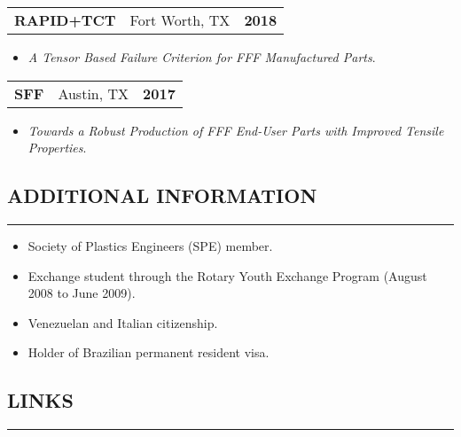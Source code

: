 \documentclass[11pt,letterpaper]{article}
\makeatletter
\newcommand{\headerrow}[3]
{\vspace{0.4em}
\noindent
\begin{tabular*}{\textwidth}{l @{\extracolsep{\fill}} cr}
	\textbf{#1} & %
	#2 &		  %
	\textbf{#3}\\ %
\end{tabular*}}
\makeatother
\begin{document}
	\headerrow
		{RAPID+TCT}{Fort Worth, TX}{2018}
	\begin{itemize}
		\item \emph{A Tensor Based Failure Criterion for FFF Manufactured Parts}.
	\end{itemize}

	\headerrow
		{SFF}
		{Austin, TX}
		{2017}
	\begin{itemize}
		\item \emph{Towards a Robust Production of FFF End-User Parts with Improved Tensile Properties}. 
	\end{itemize}


	
\subsection*{ADDITIONAL INFORMATION}
	\vspace{-0.5em}
	\hrule
	\vspace{0.8em}
	\begin{itemize}
		\item Society of Plastics Engineers (SPE) member.
		\item Exchange student through the Rotary Youth Exchange Program (August 2008 to June 2009).
		\item Venezuelan and Italian citizenship.
		\item Holder of Brazilian permanent resident visa.
	\end{itemize}
	
\subsection*{LINKS}
	\vspace{-0.5em}
	\hrule
	\vspace{-0.6em}
	
	\renewcommand{\theendnote}{ } %
	\theendnotes
\renewcommand\refname{PUBLICATIONS}
	

	
\end{document}
